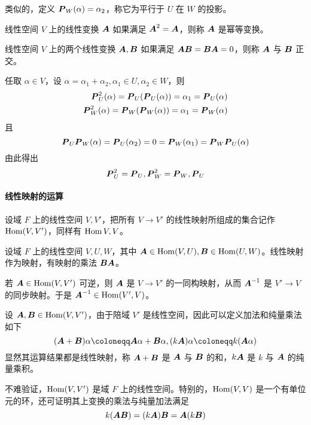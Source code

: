 类似的，定义 $\boldsymbol{P}_W(\alpha) = \alpha_2$，称它为平行于 $U$ 在 $W$ 的投影。

\begin{definition}[幂等变换]
	线性空间 $V$ 上的线性变换 $\boldsymbol{A}$ 如果满足 $\boldsymbol{A}^2 = \boldsymbol{A}$，则称 $\boldsymbol{A}$ 是幂等变换。
\end{definition}

\begin{definition}
	线性空间 $V$ 上的两个线性变换 $\boldsymbol{A}, \boldsymbol{B}$ 如果满足 $\boldsymbol{A}\boldsymbol{B} = \boldsymbol{B}\boldsymbol{A} = 0$，则称 $\boldsymbol{A}$ 与 $\boldsymbol{B}$ 正交。
\end{definition}

任取 $\alpha\in V$，设 $\alpha = \alpha_1 + \alpha_2, \alpha_1 \in U, \alpha_2 \in W$，则
\[
	\begin{aligned}
		\boldsymbol{P}_U^2(\alpha) = \boldsymbol{P}_U(\boldsymbol{P}_U(\alpha)) = \alpha_1 = \boldsymbol{P}_U(\alpha) \\
		\boldsymbol{P}_W^2(\alpha) = \boldsymbol{P}_W(\boldsymbol{P}_W(\alpha)) = \alpha_1 = \boldsymbol{P}_W(\alpha)
	\end{aligned}
\]
且
\[ \boldsymbol{P}_U\boldsymbol{P}_W(\alpha) = \boldsymbol{P}_U(\alpha_2) = 0 = \boldsymbol{P}_W(\alpha_1) = \boldsymbol{P}_W\boldsymbol{P}_U(\alpha) \]
由此得出
\[ \boldsymbol{P}_U^2 = \boldsymbol{P}_U, \boldsymbol{P}_W^2 = \boldsymbol{P}_W, \boldsymbol{P}_U \]

\paragraph{线性映射的运算}

设域 $F$ 上的线性空间 $V,V'$，把所有 $V \to V'$ 的线性映射所组成的集合记作 $\operatorname{Hom}(V,V')$，同样有 $\operatorname{Hom}{V,V}$。

设域 $F$ 上的线性空间 $V,U,W$，其中 $\boldsymbol{A} \in \operatorname{Hom}(V,U), \boldsymbol{B} \in \operatorname{Hom}(U,W)$。线性映射作为映射，有映射的乘法 $\boldsymbol{B}\boldsymbol{A}$。

若 $\boldsymbol{A}\in \operatorname{Hom}(V,V')$ 可逆，则 $\boldsymbol{A}$ 是 $V \to V'$ 的一同构映射，从而 $\boldsymbol{A}^{-1}$ 是 $V' \to V$ 的同步映射。于是 $\boldsymbol{A}^{-1} \in \operatorname{Hom}(V',V)$。

设 $\boldsymbol{A},\boldsymbol{B} \in \operatorname{Hom} (V,V')$，由于陪域 $V'$ 是线性空间，因此可以定义加法和纯量乘法如下
\[ (\vbf{A} + \vbf{B}) \alpha \coloneqq \vbf{A}\alpha + \vbf{B}\alpha, (k\vbf{A})\alpha \coloneqq k(\vbf{A} \alpha) \]
显然其运算结果都是线性映射，称 $\boldsymbol{A} + \boldsymbol{B}$ 是 $\boldsymbol{A}$ 与 $\boldsymbol{B}$ 的和，$k\boldsymbol{A}$ 是 $k$ 与 $\boldsymbol{A}$ 的纯量乘积。

不难验证，$\operatorname{Hom}(V,V')$ 是域 $F$ 上的线性空间。特别的，$\operatorname{Hom}(V,V)$ 是一个有单位元的环，还可证明其上变换的乘法与纯量加法满足
\[ k(\boldsymbol{A}\boldsymbol{B}) = (k\boldsymbol{A})\boldsymbol{B} = \boldsymbol{A}(k\boldsymbol{B}) \]


